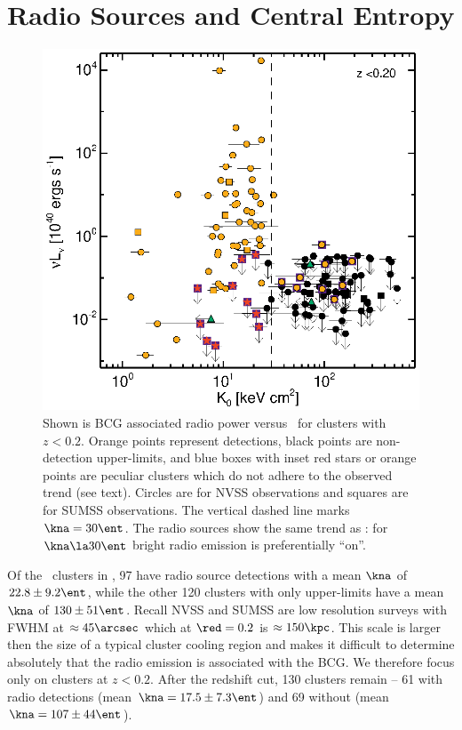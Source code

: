 \documentclass{emulateapj}
\begin{document}
\section{Radio Sources and Central Entropy}
\label{sec:agn}

\begin{figure}
  \begin{center}
    \includegraphics*[width=\columnwidth, trim=28mm 7mm 40mm 17mm, clip]{radio_zcut}
    \caption{Shown is BCG associated radio power versus \kna\ for
      clusters with $z < 0.2$. Orange points represent detections,
      black points are non-detection upper-limits, and blue boxes with
      inset red stars or orange points are peculiar clusters which do
      not adhere to the observed trend (see text). Circles are for
      NVSS observations and squares are for SUMSS observations. The
      vertical dashed line marks $\kna = 30 \ent$. The radio sources
      show the same trend as \halpha: for $\kna \la 30 \ent$ bright
      radio emission is preferentially ``on''.}
    \label{fig:radzcut}
  \end{center}
\end{figure}

Of the \clnum\ clusters in \accept, 97 have radio source detections
with a mean $\kna$ of $22.8 \pm 9.2 \ent$, while the other 120
clusters with only upper-limits have a mean $\kna$ of $130 \pm 51
\ent$. Recall NVSS and SUMSS are low resolution surveys with FWHM at
$\approx 45\arcsec$ which at $\red = 0.2$ is $\approx 150\kpc$. This
scale is larger then the size of a typical cluster cooling region and
makes it difficult to determine absolutely that the radio emission is
associated with the BCG. We therefore focus only on clusters at $z <
0.2$. After the redshift cut, 130 clusters remain -- 61 with radio
detections (mean $\kna = 17.5 \pm 7.3 \ent$) and 69 without (mean
$\kna = 107 \pm 44 \ent$).
\end{document}

